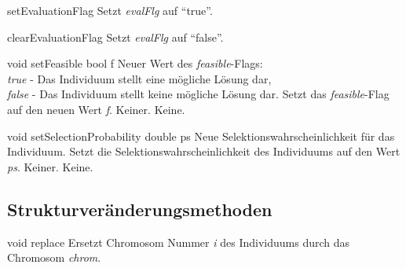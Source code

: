 \documentclass{report}
\begin{document}
\newpage

\setNormalInstance
\printEmptyMethod
{setEvaluationFlag}
{Setzt {\em evalFlg} auf ``true''.}

\vspace{4ex}

\setNormalInstance
\printEmptyMethod
{clearEvaluationFlag}
{Setzt {\em evalFlg} auf ``false''.}

\vspace{4ex}

\setNormalInstance
\printMethodWithOneParam
{void}
{setFeasible}
{bool}
{f}
{Neuer Wert des {\em feasible}-Flags:\\
{\em true} - Das Individuum stellt eine m\"ogliche L\"osung dar,\\
{\em false} - Das Individuum stellt keine m\"ogliche L\"osung dar.}
{Setzt das {\em feasible}-Flag auf den neuen Wert {\em f}.}
{Keiner.}
{Keine.}

\vspace{4ex}

\setNormalInstance
\printMethodWithOneParam
{void}
{setSelectionProbability}
{double}
{ps}
{Neue Selektionswahrscheinlichkeit f\"ur das 
                         Individuum.}
{Setzt die Selektionswahrscheinlichkeit des Individuums auf den Wert {\em ps}.}
{Keiner.}
{Keine.}

\newpage

\subsection{Strukturver\"anderungsmethoden}

\setNormalInstance
\setCorrectWidthThree{8pt}
\printMethodWithParamsSaved
{void}
{}
{replace}
{Ersetzt Chromosom Nummer {\em i} des Individuums durch das Chromosom 
    {\em chrom}.}
{}
\setCorrectWidthThree{4pt}
\end{document}

